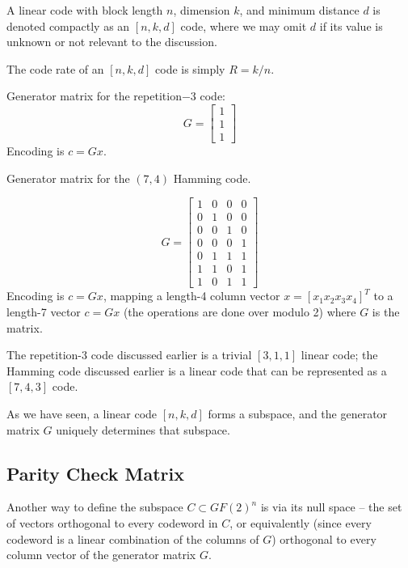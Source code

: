 A linear code with block length \(n\), dimension \(k\), and minimum distance \(d\) is denoted compactly as an \([n, k, d]\) code, where we may omit \(d\) if its value is unknown or not relevant to the discussion.

The code rate of an \([n, k, d]\) code is simply \(R= k/n\).

\begin{example}
Generator matrix for the repetition\(-3\) code: 
$$G = \begin{bmatrix}
    1 \\
    1 \\
    1
\end{bmatrix}$$
Encoding is \(c = Gx\).
\end{example}

\begin{example}
Generator matrix for the \((7,4)\) Hamming code. 

 
$$G = \begin{bmatrix}
    1 & 0 & 0 & 0\\
    0 & 1 & 0 & 0\\
    0 & 0 & 1 & 0\\
    0 & 0 & 0 & 1\\
    0 & 1 & 1 & 1\\
    1 & 1 & 0 & 1\\
    1 & 0 & 1 & 1
\end{bmatrix}$$
Encoding is \(c = Gx\), mapping a length-4 column vector \(x = [x_1 x_2 x_3 x_4]^T\) to a length-7 vector \(c = G x\) (the operations are done over modulo 2) where \(G\) is the matrix.
\end{example}



The repetition-3 code discussed earlier is a trivial \([3, 1, 1]\) linear code; the Hamming code discussed earlier is a linear code that can be represented as a \([7, 4, 3]\) code.

As we have seen, a linear code \([n, k, d]\) forms a subspace, and the generator matrix \(G\) uniquely determines that subspace. 




\subsection{Parity Check Matrix}
Another way to define the subspace \(C \subset GF(2)^n\) is via its null space -- the set of vectors orthogonal to every codeword in \(C\), or equivalently (since every codeword is a linear combination of the columns of \(G\)) orthogonal to every column vector of the generator matrix \(G\).

